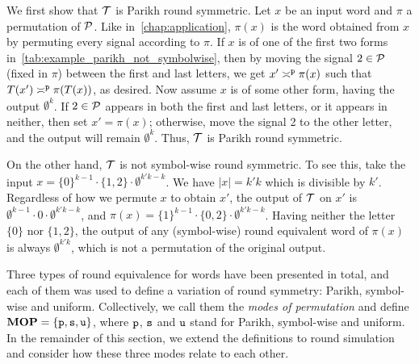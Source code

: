 \begin{example}
We first show that $\cT$ is Parikh round symmetric. Let $x$ be an input word and $\pi$ a permutation of $\cP$. Like in~\cref{chap:application}, $\pi(x)$ is the word obtained from $x$ by permuting every signal according to $\pi$. If $x$ is of one of the first two forms in~\cref{tab:example_parikh_not_symbolwise}, then by moving the signal $2\in \cP$ (fixed in $\pi$) between the first and last letters, we get $x'\reqtype[]{p} \pi(x)$ such that $T(x')\reqtype[]{p} \pi(T(x))$, as desired. Now assume $x$ is of some other form, having the output $\emptyset^k$. If $2\in \cP$ appears in both the first and last letters, or it appears in neither, then set $x'=\pi(x)$; otherwise, move the signal 2 to the other letter, and the output will remain $\emptyset^k$. Thus, $\cT$ is Parikh round symmetric.

On the other hand, $\cT$ is not symbol-wise round symmetric. To see this, take the input $x=\{0\}^{k-1}\cdot\{1,2\}\cdot\emptyset^{k'k-k}$. We have $|x|=k'k$ which is divisible by $k'$. Regardless of how we permute $x$ to obtain $x'$, the output of $\cT$ on $x'$ is $\emptyset^{k-1}\cdot0\cdot\emptyset^{k'k-k}$, and $\pi(x)=\{1\}^{k-1}\cdot\{0,2\}\cdot\emptyset^{k'k-k}$. Having neither the letter $\{0\}$ nor $\{1,2\}$, the output of any (symbol-wise) round equivalent word of $\pi(x)$ is always $\emptyset^{k'k}$, which is not a permutation of the original output.

\end{example}

Three types of round equivalence for words have been presented in total, and each of them was used to define a variation of round symmetry: Parikh, symbol-wise and uniform. Collectively, we call them the \emph{modes of permutation} and define $\RSTYPES=\{\rstype{p}, \rstype{s}, \rstype{u}\}$, where $\rstype{p}$, $\rstype{s}$ and $\rstype{u}$ stand for Parikh, symbol-wise and uniform. In the remainder of this section, we extend the definitions to round simulation and consider how these three modes relate to each other.

